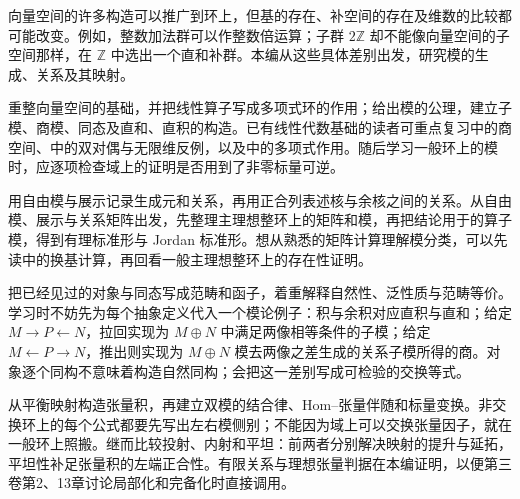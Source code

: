 
\BookPartGuide
向量空间的许多构造可以推广到环上，但基的存在、补空间的存在及维数的比较都可能改变。例如，整数加法群可以作整数倍运算；子群 \(2\mathbb Z\) 却不能像向量空间的子空间那样，在 \(\mathbb Z\) 中选出一个直和补群。本编从这些具体差别出发，研究模的生成、关系及其映射。

\ProseParagraphBreak
{}重整向量空间的基础，并把线性算子写成多项式环的作用；给出模的公理，建立子模、商模、同态及直和、直积的构造。已有线性代数基础的读者可重点复习中的商空间、中的双对偶与无限维反例，以及中的多项式作用。随后学习一般环上的模时，应逐项检查域上的证明是否用到了非零标量可逆。

\ProseParagraphBreak
{}用自由模与展示记录生成元和关系，再用正合列表述核与余核之间的关系。从自由模、展示与关系矩阵出发，先整理主理想整环上的矩阵和模，再把结论用于的算子模，得到有理标准形与 Jordan 标准形。想从熟悉的矩阵计算理解模分类，可以先读中的换基计算，再回看一般主理想整环上的存在性证明。

\ProseParagraphBreak
{}把已经见过的对象与同态写成范畴和函子，着重解释自然性、泛性质与范畴等价。学习时不妨先为每个抽象定义代入一个模论例子：积与余积对应直积与直和；给定 \(M\to P\leftarrow N\)，拉回实现为 \(M\oplus N\) 中满足两像相等条件的子模；给定 \(M\leftarrow P\to N\)，推出则实现为 \(M\oplus N\) 模去两像之差生成的关系子模所得的商。对象逐个同构不意味着构造自然同构；会把这一差别写成可检验的交换等式。

\ProseParagraphBreak
{}从平衡映射构造张量积，再建立双模的结合律、Hom--张量伴随和标量变换。非交换环上的每个公式都要先写出左右模侧别；不能因为域上可以交换张量因子，就在一般环上照搬。继而比较投射、内射和平坦：前两者分别解决映射的提升与延拓，平坦性补足张量积的左端正合性。有限关系与理想张量判据在本编证明，以便第三卷第2、13章讨论局部化和完备化时直接调用。

